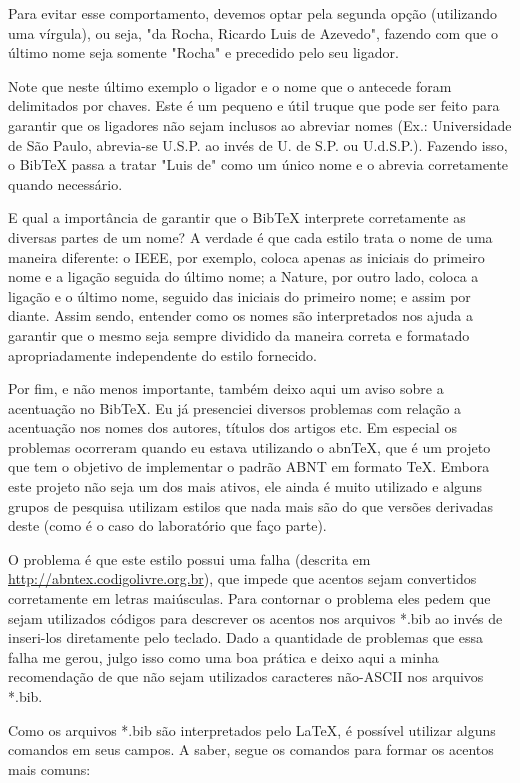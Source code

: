 \begin{anexosenv}
Para evitar esse comportamento, devemos optar pela segunda opção (utilizando uma vírgula), ou seja, "da Rocha, Ricardo {Luis de} Azevedo"{}, fazendo com que o último nome seja somente "Rocha"{} e precedido pelo seu ligador.

Note que neste último exemplo o ligador e o nome que o antecede foram delimitados por chaves. Este é um pequeno e útil truque que pode ser feito para garantir que os ligadores não sejam inclusos ao abreviar nomes (Ex.: Universidade de São Paulo, abrevia-se U.S.P. ao invés de U. de S.P. ou U.d.S.P.). Fazendo isso, o BibTeX passa a tratar "Luis de"{} como um único nome e o abrevia corretamente quando necessário.

E qual a importância de garantir que o BibTeX interprete corretamente as diversas partes de um nome? A verdade é que cada estilo trata o nome de uma maneira diferente: o IEEE, por exemplo, coloca apenas as iniciais do primeiro nome e a ligação seguida do último nome; a Nature, por outro lado, coloca a ligação e o último nome, seguido das iniciais do primeiro nome; e assim por diante. Assim sendo, entender como os nomes são interpretados nos ajuda a garantir que o mesmo seja sempre dividido da maneira correta e formatado apropriadamente independente do estilo fornecido.

Por fim, e não menos importante, também deixo aqui um aviso sobre a acentuação no BibTeX. Eu já presenciei diversos problemas com relação a acentuação nos nomes dos autores, títulos dos artigos etc. Em especial os problemas ocorreram quando eu estava utilizando o abnTeX, que é um projeto que tem o objetivo de implementar o padrão ABNT em formato TeX. Embora este projeto não seja um dos mais ativos, ele ainda é muito utilizado e alguns grupos de pesquisa utilizam estilos que nada mais são do que versões derivadas deste (como é o caso do laboratório que faço parte).

O problema é que este estilo possui uma falha (descrita em \href{http://abntex.codigolivre.org.br/node5.html}{http://abntex.codigolivre.org.br}), que impede que acentos sejam convertidos corretamente em letras maiúsculas. Para contornar o problema eles pedem que sejam utilizados códigos para descrever os acentos nos arquivos *.bib ao invés de inseri-los diretamente pelo teclado. Dado a quantidade de problemas que essa falha me gerou, julgo isso como uma boa prática e deixo aqui a minha recomendação de que não sejam utilizados caracteres não-ASCII nos arquivos *.bib.

Como os arquivos *.bib são interpretados pelo LaTeX, é possível utilizar alguns comandos em seus campos. A saber, segue os comandos para formar os acentos mais comuns:
\\
\\
\\




\end{anexosenv}
